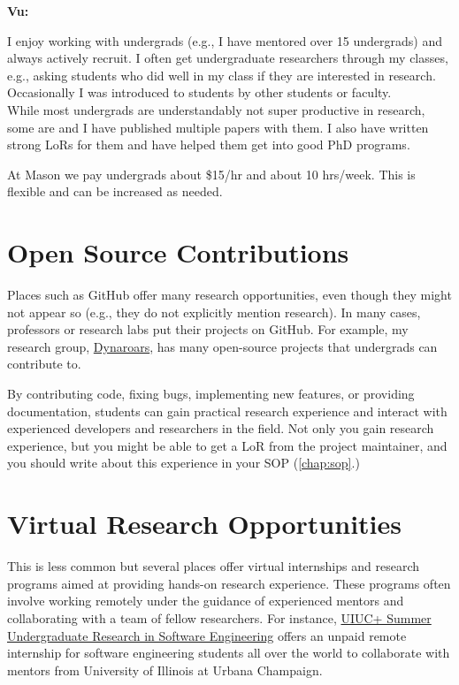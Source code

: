 \documentclass[oneside,11pt,dvipsnames]{book}
\newenvironment{commentbox}[1][]{
  \small
  \begin{mybox}
    {\small \textbf{#1}}
  }{
  \end{mybox}
}
\begin{document}
\begin{commentbox}[Vu:]
    I enjoy working with undergrads (e.g., I have mentored over 15 undergrads) and always actively recruit.
    I often get undergraduate researchers through my classes, e.g., asking students who did well in my class if they are interested in research.  Occasionally I was introduced to students by other students or faculty.\\

    While most undergrads are understandably not super productive in research, some are and I have published multiple papers with them.  
    I also have written strong LoRs for them and have helped them get into good PhD programs.

    \tcblower
    At Mason we pay undergrads about \$15/hr and about 10 hrs/week. This is flexible and can be increased as needed.
\end{commentbox}

\section{Open Source Contributions}

Places such as GitHub offer many research opportunities, even though they might not appear so (e.g., they do not explicitly mention research).
In many cases, professors or research labs put their projects on GitHub. For example, my research group, \href{https://github.com/dynaroars/}{Dynaroars}, has many open-source projects that undergrads can contribute to.

By contributing code, fixing bugs, implementing new features, or providing documentation, students can gain practical research experience and interact with experienced developers and researchers in the field. Not only you gain research experience, but you might be able to get a LoR from the project maintainer, and you should write about this experience in your SOP (\autoref{chap:sop}.)

\section{Virtual Research Opportunities} 
This is less common but several places offer virtual internships and research programs aimed at providing hands-on research experience. These programs often involve working remotely under the guidance of experienced mentors and collaborating with a team of fellow researchers. For instance, \href{https://docs.google.com/forms/d/1btIwt4HwjyKMOUk-EMy3rbkfWzFxv2lNrMm_zkd0pA4/viewform?edit_requested=true}{UIUC+ Summer Undergraduate Research in Software Engineering}  offers an unpaid remote internship for software engineering students all over the world to collaborate with mentors from University of Illinois at Urbana Champaign.
\end{document}
